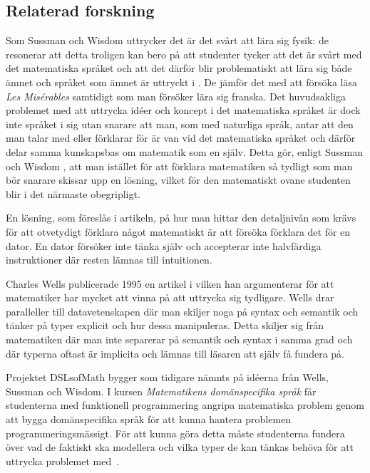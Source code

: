 \documentclass[]{article}
\begin{document}
\subsection{Relaterad forskning}
Som Sussman och Wisdom uttrycker det är det svårt att lära sig fysik: 
de resonerar att detta troligen kan bero på
att studenter tycker att det är svårt med det matematiska språket och
att det därför blir problematiskt att lära sig både ämnet och språket
som ämnet är uttryckt i \cite{sussman2002role}. De jämför det med att försöka läsa
\textit{Les Misérables} samtidigt som man försöker lära sig
franska. Det huvudsakliga problemet med att uttrycka idéer och koncept
i det matematiska språket är dock inte språket i sig utan snarare att
man, som med naturliga språk, antar att den man talar med eller
förklarar för är van vid det matematiska språket och därför delar
samma kunskapsbas om matematik som en själv. Detta gör, enligt Sussman
och Wisdom \cite{sussman2002role}, att man istället för att förklara
matematiken så tydligt som man bör snarare skissar upp en lösning,
vilket för den matematiskt ovane studenten blir i det närmaste
obegripligt.

En lösning, som föreslås i artikeln, på hur man hittar den
detaljnivån som krävs för att otvetydigt förklara något matematiskt är
att försöka förklara det för en dator. En dator försöker inte tänka
själv och accepterar inte halvfärdiga instruktioner där resten lämnas
till intuitionen.

Charles Wells publicerade 1995 en artikel
\cite{wells1995communicating} i vilken han argumenterar för att
matematiker har mycket att vinna på att uttrycka sig tydligare. Wells
drar paralleller till datavetenskapen där man skiljer noga på syntax
och semantik och tänker på typer explicit och hur dessa
manipuleras. Detta skiljer sig från matematiken där man inte separerar
på semantik och syntax i samma grad och där typerna oftast är
implicita och lämnas till läsaren att själv få fundera på.

Projektet DSLsofMath bygger som tidigare nämnts på idéerna från Wells,
Sussman och Wisdom. I kursen \textit{Matematikens domänspecifika
 språk} får studenterna med funktionell programmering angripa
matematiska problem genom att bygga domänspecifika språk för att kunna
hantera problemen programmeringsmässigt. För att kunna göra detta
måste studenterna fundera över vad de faktiskt ska modellera och vilka
typer de kan tänkas behöva för att uttrycka problemet
med~\cite{kursplan:dslsofmath}.

\newpage
\end{document}
